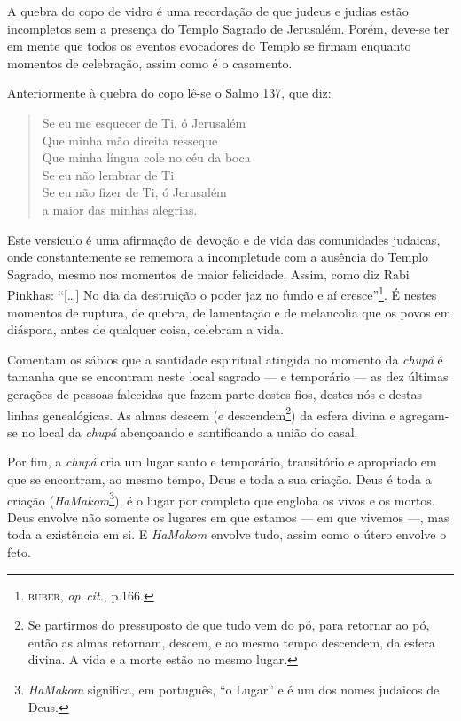 A quebra do copo de vidro é uma recordação de que judeus e judias estão
incompletos sem a presença do Templo Sagrado de Jerusalém. Porém,
deve-se ter em mente que todos os eventos evocadores do Templo se firmam
enquanto momentos de celebração, assim como é o casamento.

Anteriormente à quebra do copo lê-se o Salmo 137, que diz: 

\begin{verse}
Se eu me esquecer de Ti, ó Jerusalém\\
Que minha mão direita resseque\\
Que minha língua cole no céu da boca\\
Se eu não lembrar de Ti\\
Se eu não fizer de Ti, ó Jerusalém\\
a maior das minhas alegrias.
\end{verse}

Este versículo é uma afirmação de devoção e de vida das comunidades judaicas, onde
constantemente se rememora a incompletude com a ausência do Templo
Sagrado, mesmo nos momentos de maior felicidade. Assim, como diz Rabi
Pinkhas: ``{[}\ldots{}{]} No dia da destruição o poder jaz no fundo e
aí cresce''\footnote{\textsc{buber}, \emph{op.\,cit.}, p.166.}. É nestes momentos de
ruptura, de quebra, de lamentação e de melancolia que os povos em
diáspora, antes de qualquer coisa, celebram a vida.

Comentam os sábios que a santidade espiritual atingida no momento da
\emph{chupá} é tamanha que se encontram neste local sagrado --- e
temporário --- as dez últimas gerações de pessoas falecidas que fazem
parte destes fios, destes nós e destas linhas genealógicas. As almas
descem (e descendem\footnote{Se partirmos do pressuposto de que tudo vem
  do pó, para retornar ao pó, então as almas retornam, descem, e ao
  mesmo tempo descendem, da esfera divina. A vida e a morte estão no
  mesmo lugar.}) da esfera divina e agregam-se no local da \emph{chupá}
abençoando e santificando a união do casal.

Por fim, a \emph{chupá} cria um lugar santo e temporário, transitório e
apropriado em que se encontram, ao mesmo tempo, Deus e toda a sua
criação. Deus é toda a criação (\emph{HaMakom}\footnote{\emph{HaMakom}
  significa, em português, ``o Lugar'' e é um dos nomes judaicos de
  Deus.}), é o lugar por completo que engloba os vivos e os mortos. Deus
envolve não somente os lugares em que estamos --- em que vivemos ---,
mas toda a existência em si. E \emph{HaMakom} envolve tudo, assim como o
útero envolve o feto.

